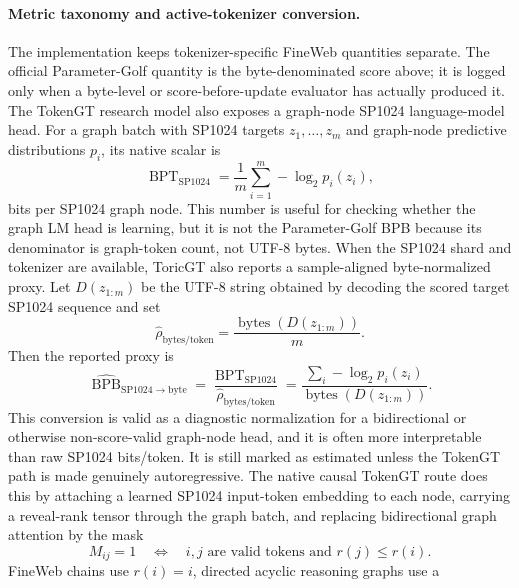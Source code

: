 \documentclass[11pt]{article}
\theoremstyle{definition}
\theoremstyle{plain}
\theoremstyle{remark}
\numberwithin{equation}{section}
\begin{document}
\paragraph{Metric taxonomy and active-tokenizer conversion.}
The implementation keeps tokenizer-specific FineWeb quantities separate.  The official
Parameter-Golf quantity is the byte-denominated score above; it is logged only
when a byte-level or score-before-update evaluator has actually produced it.
The TokenGT research model also exposes a graph-node SP1024 language-model
head.  For a graph batch with SP1024 targets $z_1,\ldots,z_m$ and graph-node
predictive distributions $p_i$, its native scalar is
\begin{equation}
  \operatorname{BPT}_{\mathrm{SP1024}}
  =
  \frac{1}{m}\sum_{i=1}^{m}-\log_2 p_i(z_i),
\end{equation}
bits per SP1024 graph node.  This number is useful for checking whether the
graph LM head is learning, but it is not the Parameter-Golf BPB because its
denominator is graph-token count, not UTF-8 bytes.  When the SP1024 shard and
tokenizer are available, ToricGT also reports a sample-aligned byte-normalized
proxy.  Let $D(z_{1:m})$ be the UTF-8 string obtained by decoding the scored
target SP1024 sequence and set
\begin{equation}
  \widehat\rho_{\mathrm{bytes/token}}
  =
  \frac{\operatorname{bytes}(D(z_{1:m}))}{m}.
\end{equation}
Then the reported proxy is
\begin{equation}
  \widehat{\operatorname{BPB}}_{\mathrm{SP1024}\to\mathrm{byte}}
  =
  \frac{\operatorname{BPT}_{\mathrm{SP1024}}}
       {\widehat\rho_{\mathrm{bytes/token}}}
  =
  \frac{\sum_i-\log_2 p_i(z_i)}
       {\operatorname{bytes}(D(z_{1:m}))}.
\end{equation}
This conversion is valid as a diagnostic normalization for a bidirectional or
otherwise non-score-valid graph-node head, and it is often more interpretable
than raw SP1024 bits/token.  It is still marked as estimated unless the
TokenGT path is made genuinely autoregressive.  The native causal TokenGT
route does this by attaching a learned SP1024 input-token embedding to each
node, carrying a reveal-rank tensor through the graph batch, and replacing
bidirectional graph attention by the mask
\begin{equation}
  M_{ij}=1\quad\Longleftrightarrow\quad
  i,j\text{ are valid tokens and } r(j)\le r(i).
\end{equation}
FineWeb chains use $r(i)=i$, directed acyclic reasoning graphs use a
\end{document}
